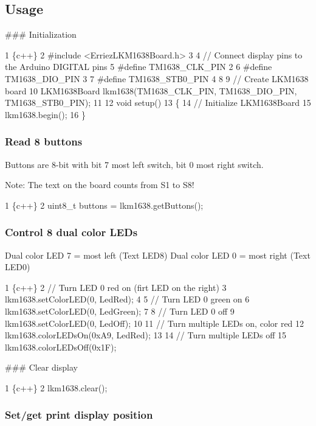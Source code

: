 \subsection*{Usage}

\#\#\# Initialization 
\begin{DoxyCode}
1 \{c++\}
2 #include <ErriezLKM1638Board.h>
3 
4 // Connect display pins to the Arduino DIGITAL pins
5 #define TM1638\_CLK\_PIN   2
6 #define TM1638\_DIO\_PIN   3
7 #define TM1638\_STB0\_PIN  4
8 
9 // Create LKM1638 board
10 LKM1638Board lkm1638(TM1638\_CLK\_PIN, TM1638\_DIO\_PIN, TM1638\_STB0\_PIN);
11 
12 void setup()
13 \{
14     // Initialize LKM1638Board
15     lkm1638.begin();
16 \}
\end{DoxyCode}


\subsubsection*{Read 8 buttons}

Buttons are 8-\/bit with bit 7 most left switch, bit 0 most right switch.

Note\+: The text on the board counts from S1 to S8!


\begin{DoxyCode}
1 \{c++\}
2 uint8\_t buttons = lkm1638.getButtons();
\end{DoxyCode}


\subsubsection*{Control 8 dual color L\+ED\textquotesingle{}s}

Dual color L\+ED 7 = most left (Text L\+E\+D8) Dual color L\+ED 0 = most right (Text L\+E\+D0)


\begin{DoxyCode}
1 \{c++\}
2 // Turn LED 0 red on (firt LED on the right)
3 lkm1638.setColorLED(0, LedRed);  
4 
5 // Turn LED 0 green on
6 lkm1638.setColorLED(0, LedGreen);
7 
8 // Turn LED 0 off
9 lkm1638.setColorLED(0, LedOff);
10 
11 // Turn multiple LEDs on, color red
12 lkm1638.colorLEDsOn(0xA9, LedRed);
13 
14 // Turn multiple LEDs off
15 lkm1638.colorLEDsOff(0x1F);
\end{DoxyCode}


\#\#\# Clear display 
\begin{DoxyCode}
1 \{c++\}
2 lkm1638.clear();
\end{DoxyCode}


\subsubsection*{Set/get print display position}


